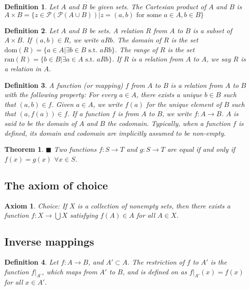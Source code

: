 \documentclass[a4paper]{article}
\newtheorem{mytheorem}{Theorem}
\newtheorem{axiom}{Axiom}
\newtheorem{mydef}{Definition}
\numberwithin{mytheorem}{section}
\numberwithin{mydef}{section}
\numberwithin{axiom}{section}
\numberwithin{example}{section}
\newcommand{\done}{$\blacksquare$ }
\begin{document}
\begin{mydef} Let $A$ and $B$ be given sets. The Cartesian product of $A$ and $B$ is $A \times B = \{ z \in \mathcal{P}(\mathcal{P}(A \cup B)) | z = (a,b) \text{ for some } a \in A, b \in B \}$
\end{mydef}

\begin{mydef} Let $A$ and $B$ be sets. A relation $R$ from $A$ to $B$ is a subset of $A \times B$. If $(a,b) \in R$, we write $a R b$. The domain of $R$ is the set $\text{dom}(R)  = \{ a \in A | \exists b \in B \text{ s.t. } a R b\}$. The range of $R$ is the set  $\text{ran}(R)  = \{ b \in B | \exists a \in A \text{ s.t. } a R b\}$. If $R$ is a relation from $A$ to $A$, we say $R$ is a relation in $A$.
\end{mydef}

\begin{mydef} A function (or mapping) $f$ from $A$ to $B$ is a relation from $A$ to $B$ with the following property: For every $a \in A$, there exists a unique $b \in B$ such that $(a,b) \in f$. Given $a \in A$, we write $f(a)$  for the unique element of $B$ such that $(a,f(a)) \in f$. If a function $f$ is from $A$ to $B$, we write $f: A \rightarrow B$. $A$ is said to be the domain of $A$ and $B$ the codomain. Typically, when a function $f$ is defined, its domain and codomain are implicitly assumed to be non-empty.
\end{mydef}

\begin{mytheorem} \done Two functions $f: S \rightarrow T$ and $g: S \rightarrow T$ are equal if and only if $f(x) = g(x)$ $\forall x \in S$.
\end{mytheorem}


\subsection{The axiom of choice}

\begin{axiom} Choice:  If $X$ is a collection of nonempty sets, then there exists a function $f: X \rightarrow \bigcup X$ satisfying $f(A) \in A$ for all $A \in X$.
\end{axiom}

\subsection{Inverse mappings}

\begin{mydef} Let $f: A \rightarrow B$, and $A' \subset A$. The restriction of $f$ to $A'$ is the function $f|_{A'}$, which maps from $A'$ to $B$, and is defined on as $f|_{A'}(x) = f(x)$ for all $x \in A'$.
\end{mydef}
\end{document}
